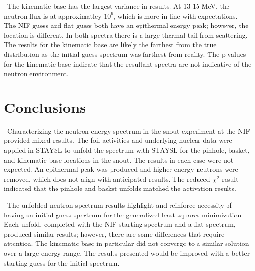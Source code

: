 \documentclass[journal]{IEEEtran}
\begin{document}
{	\ The kinematic base has the largest variance in results. 
At 13-15 MeV, the neutron flux is at approximatley $10^{9}$, which is more in line with expectations. 
The NIF guess and flat guess both have an epithermal energy peak; however, the location is different. 
In both spectra there is a large thermal tail from scattering. 
The results for the kinematic base are likely the farthest from the true distribution as the initial guess spectrum was farthest from reality. 
The p-values for the kinematic base indicate that the resultant spectra are not indicative of the neutron environment. 
	 
	\section{Conclusions}
	
	\ Characterizing the neutron energy spectrum in the snout experiment at the NIF provided mixed results. 
The foil activities and underlying nuclear data were applied in STAYSL to unfold the spectrum with STAYSL for the pinhole, basket, and kinematic base locations in the snout. 
The results in each case were not expected. 
An epithermal peak was produced and higher energy neutrons were removed, which does not align with anticipated results. 
The reduced $\chi^{2}$  result indicated that the pinhole and basket unfolds matched the activation results. 
	
	\ The unfolded neutron spectrum results highlight and reinforce necessity of having an initial guess spectrum for the generalized least-squares minimization. 
Each unfold, completed with the NIF starting spectrum and a flat spectrum, produced similar results; however, there are some differences that require attention. 
The kinematic base in particular did not converge to a similar solution over a large energy range. 
The results presented would be improved with a better starting guess for the initial spectrum. 

	\ifCLASSOPTIONcaptionsoff
	\newpage
	\fi
	
}
\end{document}

